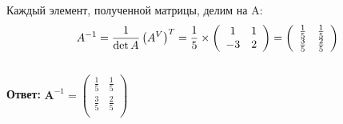 \documentclass[a4paper,12pt]{article} %
\begin{document}
Каждый элемент, полученной матрицы, делим на \det A: 
\begin{displaymath}
\\
    A^{-1}  = \frac{1}{\det A}\left(A^{V}\right)^{T} = \frac{1}{5} \times
    \left(\begin{array}{cc}
    1 & 1  \\
    -3 & 2 \\
  \end{array} \right) = 
   \left(\begin{array}{cc}
    \frac{1}{5} & \frac{1}{5}  \\
    \frac{3}{5} & \frac{2}{5} \\
  \end{array} \right) 
\end{displaymath} \\

\textbf{Ответ:} $ \mathbf{A}^{-1} = \left(\begin{array}{cc}
    \frac{1}{5} & \frac{1}{5}  \\
    \frac{3}{5} & \frac{2}{5} \\
  \end{array} \right) $
\end{document}
